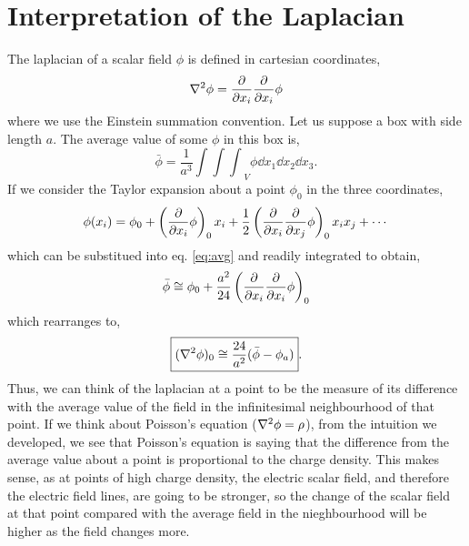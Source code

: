 \documentclass{book}
\begin{document}
\chapter{Interpretation of the Laplacian}
The laplacian of a scalar field $\phi$ is defined in cartesian coordinates,
\begin{equation}
	\laplacian{\phi} = \pdv{x_i}\pdv{x_i} \phi
\end{equation}
where we use the Einstein summation convention. Let us suppose a box with side length $a$. The average value of some $\phi$ in this box is,
\begin{equation}
	\bar{\phi} = \frac{1}{a^3}{\int\int\int}_V \phi \dd{x_1}\dd{x_2}\dd{x_3}. \label{eq:avg}
\end{equation}
If we consider the Taylor expansion about a point $\phi_0$ in the three coordinates, 
\begin{equation}
	\phi(x_i) = \phi_0 + \left(\pdv{x_i}\phi\right)_0x_i + \frac{1}{2}\left(\pdv{x_i}\pdv{x_j}\phi\right)_0x_ix_j + \cdots
\end{equation}
which can be substitued into eq. \eqref{eq:avg} and readily integrated to obtain,
\begin{equation}
	\bar{\phi} \cong \phi_0 + \frac{a^2}{24}\left(\pdv{x_i}\pdv{x_i}\phi\right)_0
\end{equation}
which rearranges to,
\begin{equation}
	\boxed{(\laplacian{\phi})_0 \cong \frac{24}{a^2}(\bar{\phi} - \phi_a)}.
\end{equation}
Thus, we can think of the laplacian at a point to be the measure of its difference with the average value of the field in the infinitesimal neighbourhood of that point. If we think about Poisson's equation ($\laplacian{\phi} = \rho$), from the intuition we developed, we see that Poisson's equation is saying that the difference from the average value about a point is proportional to the charge density. This makes sense, as at points of high charge density, the electric scalar field, and therefore the electric field lines, are going to be stronger, so the change of the scalar field at that point compared with the average field in the nieghbourhood will be higher as the field changes more.
\end{document}
